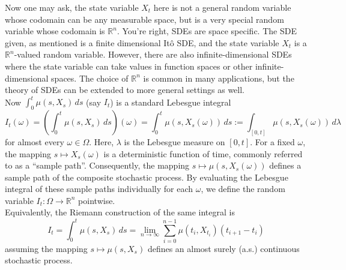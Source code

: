 \documentclass[11pt]{amsart}
\theoremstyle{plain}
\theoremstyle{definition}
\theoremstyle{remark}
\numberwithin{equation}{section}
\begin{document}
Now one may ask, the state variable $X_t$ here is not a general random variable whose codomain can be any measurable space, but is a very special random variable whose codomain is $\mathbb{R}^n$. You're right, SDEs are space specific. The SDE given, as mentioned is a finite dimensional It\^{o} SDE, and the state variable $X_t$ is a $\mathbb{R}^n$-valued random variable. However, there are also infinite-dimensional SDEs where the state variable can take values in function spaces or other infinite-dimensional spaces. The choice of $\mathbb{R}^n$ is common in many applications, but the theory of SDEs can be extended to more general settings as well.\\

Now $\int_0^t \mu(s, X_s)\,ds$ (say $I_t$) is a standard Lebesgue integral
\begin{equation}
    I_t(\omega)=\left( \int_0^t \mu(s, X_s)\,ds \right)(\omega) = \int_0^t \mu(s, X_s(\omega))\,ds := \int_{[0,t]} \mu(s, X_s(\omega)) \, d\lambda
    \label{dettol}
\end{equation}
for almost every $\omega \in \Omega$. Here, $\lambda$ is the Lebesgue measure on $[0, t]$. For a fixed $\omega$, the mapping $s \mapsto X_s(\omega)$ is a deterministic function of time, commonly referred to as a ``sample path''. Consequently, the mapping $s \mapsto \mu(s, X_s(\omega))$ defines a sample path of the composite stochastic process. By evaluating the Lebesgue integral of these sample paths individually for each $\omega$, we define the random variable $I_t : \Omega \to \mathbb{R}^n$ pointwise.\\

Equivalently, the Riemann construction of the same integral is 
\begin{equation}
    I_t=\int_0^t \mu(s, X_s)\,ds = \lim_{n \to \infty} \sum_{i=0}^{n-1} \mu(t_i, X_{t_i}) (t_{i+1} - t_i)
    \label{yellow}
\end{equation}
assuming the mapping $s \mapsto \mu(s, X_s)$ defines an almost surely (a.s.) continuous stochastic process.

\\
\end{document}
